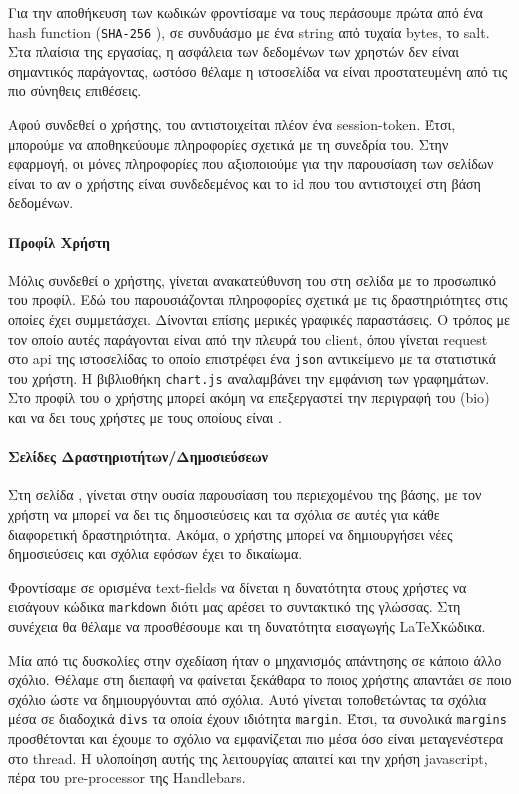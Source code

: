 \documentclass[acmtog, nonacm, language=english, language=greek]{acmart}
\newcommand{\en}[1]{\textlatin{#1}}
\newcommand{\src}[1]{\texttt{\en{#1}}}
\begin{document}
Για την αποθήκευση των κωδικών φροντίσαμε να τους περάσουμε πρώτα από 
ένα \en{hash function} (\src{SHA-256} \cite{SHA256}), σε συνδυάσμο 
με ένα \en{string} από τυχαία \en{bytes}, το \en{salt}.
Στα πλαίσια της εργασίας, η ασφάλεια των δεδομένων των χρηστών δεν είναι 
σημαντικός παράγοντας, ωστόσο θέλαμε η ιστοσελίδα να είναι προστατευμένη 
από τις πιο σύνηθεις επιθέσεις.

Αφού συνδεθεί ο χρήστης, του αντιστοιχείται πλέον ένα \en{session-token}. Έτσι,
μπορούμε να αποθηκεύουμε πληροφορίες σχετικά με τη συνεδρία του. Στην εφαρμογή,
οι μόνες πληροφορίες που αξιοποιούμε για την παρουσίαση των σελίδων είναι το αν
ο χρήστης είναι συνδεδεμένος και το \en{id} που του αντιστοιχεί στη βάση
δεδομένων.

\paragraph{Προφίλ Χρήστη}

Μόλις συνδεθεί ο χρήστης, γίνεται ανακατεύθυνση του 
στη σελίδα με το προσωπικό του προφίλ. Εδώ του 
παρουσιάζονται πληροφορίες σχετικά με τις δραστηριότητες 
στις οποίες έχει συμμετάσχει. 
Δίνονται επίσης μερικές γραφικές παραστάσεις. Ο τρόπος με τον οποίο 
αυτές παράγονται είναι από την πλευρά του \en{client}, όπου γίνεται 
\en{request} στο \en{api} της ιστοσελίδας το οποίο επιστρέφει 
ένα \src{json} αντικείμενο με τα στατιστικά του χρήστη. 
Η βιβλιοθήκη \src{chart.js} \cite{ChartJS}
αναλαμβάνει την εμφάνιση των γραφημάτων.
Στο προφίλ του ο χρήστης μπορεί ακόμη να επεξεργαστεί την περιγραφή του 
(\en{bio}) και να δει τους χρήστες με τους οποίους είναι .

\paragraph{Σελίδες Δραστηριοτήτων/Δημοσιεύσεων}

Στη σελίδα \say{\en{Activities}}, γίνεται στην ουσία παρουσίαση του
περιεχομένου της βάσης, με τον χρήστη να μπορεί να δει τις δημοσιεύσεις και τα
σχόλια σε αυτές για κάθε διαφορετική δραστηριότητα. Ακόμα, ο χρήστης μπορεί να
δημιουργήσει νέες δημοσιεύσεις και σχόλια εφόσων έχει το δικαίωμα.

Φροντίσαμε σε ορισμένα \en{text-fields} να δίνεται η δυνατότητα 
στους χρήστες να εισάγουν κώδικα \src{markdown} διότι
μας αρέσει το συντακτικό της γλώσσας. Στη συνέχεια 
θα θέλαμε να προσθέσουμε και τη δυνατότητα εισαγωγής \LaTeX κώδικα.

Μία από τις δυσκολίες στην σχεδίαση ήταν ο μηχανισμός απάντησης
σε κάποιο άλλο σχόλιο. Θέλαμε στη διεπαφή να φαίνεται 
ξεκάθαρα το ποιος χρήστης απαντάει σε ποιο σχόλιο
ώστε να δημιουργόυνται  από σχόλια.
Αυτό γίνεται τοποθετώντας τα σχόλια μέσα σε διαδοχικά \src{divs}
τα οποία έχουν ιδιότητα \src{margin}. Έτσι, τα συνολικά 
\src{margins} προσθέτονται και έχουμε το σχόλιο να εμφανίζεται πιο μέσα 
όσο είναι μεταγενέστερα στο \en{thread}. Η υλοποίηση αυτής 
της λειτουργίας απαιτεί και την χρήση \en{javascript}, πέρα 
του \en{pre-processor} της \en{Handlebars}.
\end{document}
